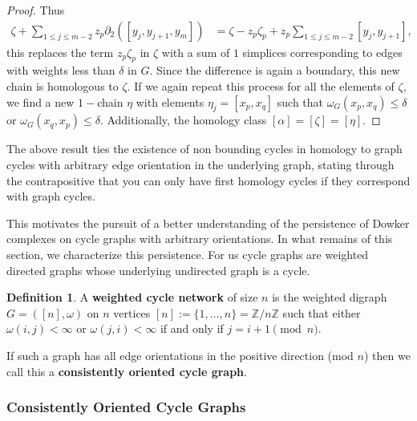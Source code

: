 \documentclass[pdflatex,bst/sn-mathphys-num]{sn-jnl}%
\theoremstyle{thmstyleone}%
\newtheorem{prop}[theorem]{Proposition}%
\theoremstyle{definition}
\theoremstyle{thmstyletwo}%
\newcommand{\FD}{\mathfrak{D}}
\theoremstyle{thmstylethree}%
\newtheorem{definition}{Definition}%
\begin{document}
\begin{proof}
    Thus 
    \begin{align*}
        \zeta + \sum_{1\leq j\leq m-2} 
        z_p \partial_2([y_j,y_{j+1},y_m])
        &=
        \zeta -z_p \zeta_p+z_p \sum_{1\leq j\leq m-2} [y_j,y_{j+1}],
    \end{align*}
    this replaces the term $z_p\zeta_p$ in $\zeta$ with a sum of $1$ simplices corresponding to edges with weights less than $\delta$ in $G$. Since the difference is again a boundary, this new chain is homologous to $\zeta$. 
    If we again repeat this process for all the elements of $\zeta$, we find a new $1-$chain $\eta$ with elements $\eta_j=[x_p,x_q]$ such that $\omega_G(x_p,x_q)\leq \delta$ or $\omega_G(x_q,x_p)\leq \delta$. Additionally, the homology class $[\alpha]=[\zeta]=[\eta]$. 
    
\end{proof}

The above result ties the existence of non bounding cycles in homology to graph cycles with arbitrary edge orientation in the underlying graph, stating through the contrapositive that you can only have first homology cycles if they correspond with graph cycles. 

This motivates the pursuit of a better understanding of the persistence of Dowker complexes on cycle graphs with arbitrary orientations. In what remains of this section, we characterize this persistence. For us cycle graphs are weighted directed graphs whose underlying undirected graph is a cycle. 

\begin{definition}
    A \textbf{weighted cycle network} of size $n$ is the weighted digraph $G = ([n],\omega)$ on $n$ vertices $[n] := \{1,\dots,n\}=\mathbb{Z} /n\mathbb{Z}$ such that either $\omega(i,j) < \infty$ or $\omega(j,i) < \infty$ if and only if $j = i+1 \pmod{n}$.
\end{definition}

If such a graph has all edge orientations in the positive direction (mod $n$) then we call this a \textbf{consistently oriented cycle graph}. 




\subsubsection{Consistently Oriented Cycle Graphs}
\end{document}
